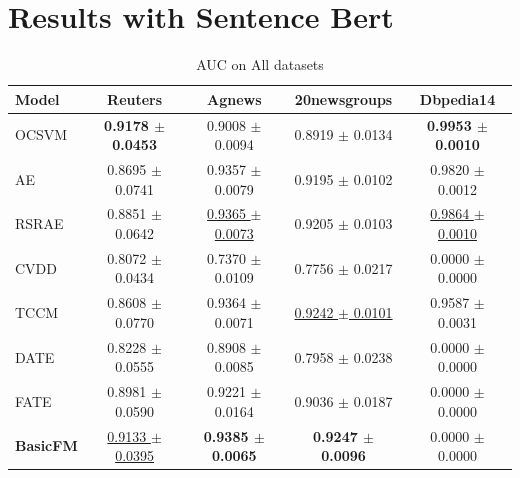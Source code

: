 \section{Results with Sentence Bert}

\begin{table}[H]
\centering
\caption{AUC on All datasets}
\begin{tabular}{lcccc}
\toprule
Model & Reuters & Agnews & 20newsgroups & Dbpedia14 \\
\midrule
OCSVM & \textbf{0.9178 $\pm$ 0.0453} & 0.9008 $\pm$ 0.0094 & 0.8919 $\pm$ 0.0134 & \textbf{0.9953 $\pm$ 0.0010} \\
AE & 0.8695 $\pm$ 0.0741 & 0.9357 $\pm$ 0.0079 & 0.9195 $\pm$ 0.0102 & 0.9820 $\pm$ 0.0012 \\
RSRAE & 0.8851 $\pm$ 0.0642 & \underline{0.9365 $\pm$ 0.0073} & 0.9205 $\pm$ 0.0103 & \underline{0.9864 $\pm$ 0.0010} \\
CVDD & 0.8072 $\pm$ 0.0434 & 0.7370 $\pm$ 0.0109 & 0.7756 $\pm$ 0.0217 & 0.0000 $\pm$ 0.0000 \\
TCCM & 0.8608 $\pm$ 0.0770 & 0.9364 $\pm$ 0.0071 & \underline{0.9242 $\pm$ 0.0101} & 0.9587 $\pm$ 0.0031 \\
DATE & 0.8228 $\pm$ 0.0555 & 0.8908 $\pm$ 0.0085 & 0.7958 $\pm$ 0.0238 & 0.0000 $\pm$ 0.0000 \\
FATE & 0.8981 $\pm$ 0.0590 & 0.9221 $\pm$ 0.0164 & 0.9036 $\pm$ 0.0187 & 0.0000 $\pm$ 0.0000 \\
\textbf{BasicFM} & \underline{0.9133 $\pm$ 0.0395} & \textbf{0.9385 $\pm$ 0.0065} & \textbf{0.9247 $\pm$ 0.0096} & 0.0000 $\pm$ 0.0000 \\
\bottomrule
\end{tabular}
\label{tab:ad_results}
\end{table}



